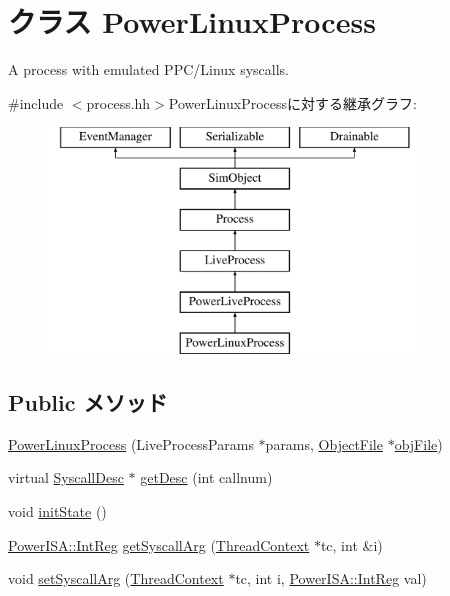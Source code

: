 \hypertarget{classPowerLinuxProcess}{
\section{クラス PowerLinuxProcess}
\label{classPowerLinuxProcess}
}


A process with emulated PPC/Linux syscalls.  


{\ttfamily \#include $<$process.hh$>$}PowerLinuxProcessに対する継承グラフ:\begin{figure}[H]
\begin{center}
\leavevmode
\includegraphics[height=6cm]{classPowerLinuxProcess}
\end{center}
\end{figure}
\subsection*{Public メソッド}
\begin{DoxyCompactItemize}
\item 
\hyperlink{classPowerLinuxProcess_ac5aac042846f3ca8ede0428ef2267eed}{PowerLinuxProcess} (LiveProcessParams $\ast$params, \hyperlink{classObjectFile}{ObjectFile} $\ast$\hyperlink{classLiveProcess_ab6cfcfa7903c66267b3e0351c3caa809}{objFile})
\item 
virtual \hyperlink{classSyscallDesc}{SyscallDesc} $\ast$ \hyperlink{classPowerLinuxProcess_aebbff609a7235342925445690acf5ee8}{getDesc} (int callnum)
\item 
void \hyperlink{classPowerLinuxProcess_a3c34ea9b29f410748d4435a667484924}{initState} ()
\item 
\hyperlink{namespacePowerISA_a0e080577527fb3e9685399f75b5caf15}{PowerISA::IntReg} \hyperlink{classPowerLinuxProcess_a4a1521e60b3fd8333fc98a5565c484ec}{getSyscallArg} (\hyperlink{classThreadContext}{ThreadContext} $\ast$tc, int \&i)
\item 
void \hyperlink{classPowerLinuxProcess_a1e515b39cc799824d1dd93d40ba28416}{setSyscallArg} (\hyperlink{classThreadContext}{ThreadContext} $\ast$tc, int i, \hyperlink{namespacePowerISA_a0e080577527fb3e9685399f75b5caf15}{PowerISA::IntReg} val)
\end{DoxyCompactItemize}
